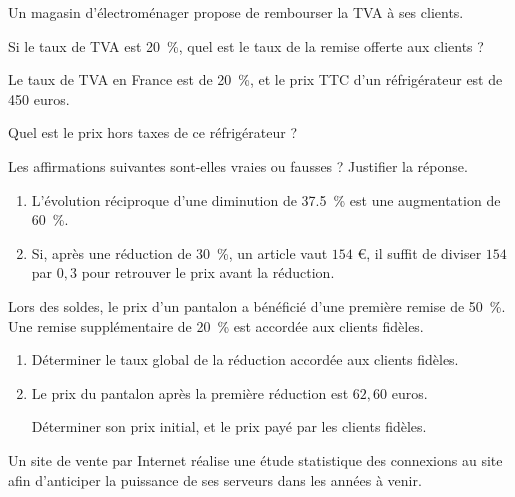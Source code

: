 \exo

Un magasin d'électroménager propose de rembourser la TVA à ses clients.

Si le taux de TVA est \SI{20}{\percent}, quel est le taux de la remise offerte aux clients ?

\exo

Le taux de TVA en France est de \SI[retain-explicit-plus]{20}{\percent}, et le prix TTC d'un réfrigérateur est de 450 euros.

Quel est le prix hors taxes de ce réfrigérateur ?

\exo

Les affirmations suivantes sont-elles vraies ou fausses ? Justifier la réponse.
\begin{enumerate}
\item L'évolution réciproque d'une diminution de \SI{37,5}{\percent} est une augmentation de \SI{60}{\percent}.
\item Si, après une réduction de \SI{30}{\percent}, un article vaut $154$ \euro{}, il suffit de diviser $154$ par $0,3$ pour retrouver le prix avant la réduction.
\end{enumerate}

\exo

Lors des soldes, le prix d'un pantalon a bénéficié d'une première remise de \SI[retain-explicit-plus]{50}{\percent}. Une remise supplémentaire de \SI[retain-explicit-plus]{20}{\percent} est accordée aux clients fidèles.
\begin{enumerate}
\item Déterminer le taux global de la réduction accordée aux clients fidèles.
\item Le prix du pantalon après la première réduction est $62,60$ euros.

Déterminer son prix initial, et le prix payé par les clients fidèles.
\end{enumerate}

\exo

Un site de vente par Internet réalise une étude statistique des connexions au site afin d'anticiper la puissance de ses serveurs dans les années à venir.

